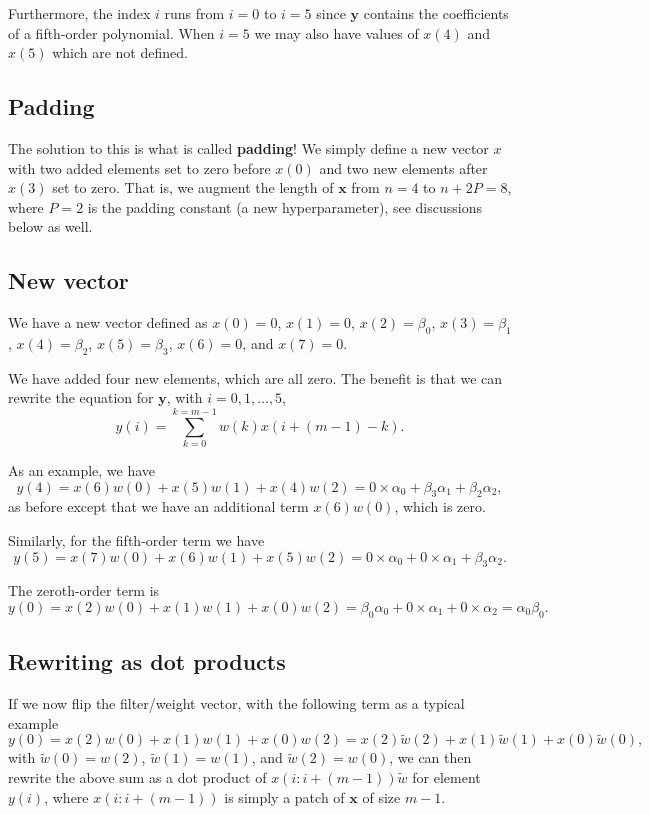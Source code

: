 \documentclass[%
oneside,                 %
final,                   %
10pt]{article}
\begin{document}
Furthermore, the index $i$ runs from $i=0$ to $i=5$ since $\bm{y}$
contains the coefficients of a fifth-order polynomial.  When $i=5$ we
may also have values of $x(4)$ and $x(5)$ which are not defined.

\subsection{Padding}

The solution to this is what is called \textbf{padding}!  We simply define a
new vector $x$ with two added elements set to zero before $x(0)$ and
two new elements after $x(3)$ set to zero. That is, we augment the
length of $\bm{x}$ from $n=4$ to $n+2P=8$, where $P=2$ is the padding
constant (a new hyperparameter), see discussions below as well.

\subsection{New vector}

We have a new vector defined as $x(0)=0$, $x(1)=0$,
$x(2)=\beta_0$, $x(3)=\beta_1$, $x(4)=\beta_2$, $x(5)=\beta_3$,
$x(6)=0$, and $x(7)=0$.

We have added four new elements, which
are all zero. The benefit is that we can rewrite the equation for
$\bm{y}$, with $i=0,1,\dots,5$,
\[
y(i) = \sum_{k=0}^{k=m-1}w(k)x(i+(m-1)-k).
\]

As an example, we have
\[
y(4)=x(6)w(0)+x(5)w(1)+x(4)w(2)=0\times \alpha_0+\beta_3\alpha_1+\beta_2\alpha_2,
\]
as before except that we have an additional term $x(6)w(0)$, which is zero.

Similarly, for the fifth-order term we have
\[
y(5)=x(7)w(0)+x(6)w(1)+x(5)w(2)=0\times \alpha_0+0\times\alpha_1+\beta_3\alpha_2.
\]

The zeroth-order term is
\[
y(0)=x(2)w(0)+x(1)w(1)+x(0)w(2)=\beta_0 \alpha_0+0\times\alpha_1+0\times\alpha_2=\alpha_0\beta_0.
\]

\subsection{Rewriting as dot products}

If we now flip the filter/weight vector, with the following term as a typical example
\[
y(0)=x(2)w(0)+x(1)w(1)+x(0)w(2)=x(2)\tilde{w}(2)+x(1)\tilde{w}(1)+x(0)\tilde{w}(0),
\]
with $\tilde{w}(0)=w(2)$, $\tilde{w}(1)=w(1)$, and $\tilde{w}(2)=w(0)$, we can then rewrite the above sum as a dot product of
$x(i:i+(m-1))\tilde{w}$ for element $y(i)$, where $x(i:i+(m-1))$ is simply a patch of $\bm{x}$ of size $m-1$.
\end{document}
